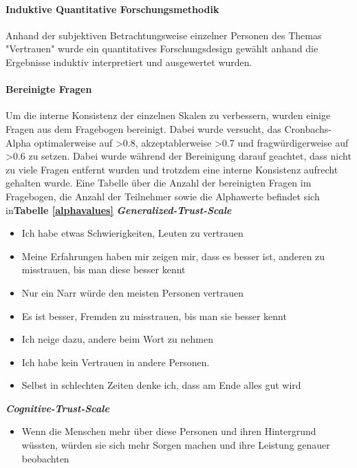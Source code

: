 \documentclass[a4paper,11pt]{article}%
\renewcommand{\\}{\vspace*{0.5\baselineskip} \newline}
\begin{document}
				\paragraph{Induktive Quantitative Forschungsmethodik}
				Anhand der subjektiven Betrachtungsweise einzelner Personen des Themas "Vertrauen" wurde ein quantitatives Forschungsdesign gewählt anhand die Ergebnisse induktiv interpretiert und ausgewertet wurden.


\paragraph{Bereinigte Fragen}
Um die interne Konsistenz der einzelnen Skalen zu verbessern, wurden einige Fragen aus dem Fragebogen bereinigt. Dabei wurde versucht, das Cronbachs-Alpha optimalerweise auf >0.8, akzeptablerweise >0.7 und fragwürdigerweise auf >0.6 zu setzen. Dabei wurde während der Bereinigung darauf geachtet, dass nicht zu viele Fragen entfernt wurden und trotzdem eine interne Konsistenz aufrecht gehalten wurde. Eine Tabelle über die Anzahl der bereinigten Fragen im Fragebogen, die Anzahl der Teilnehmer sowie die Alphawerte befindet sich in\textbf{Tabelle \ref{alphavalues}} \\
\textbf{\textit{Generalized-Trust-Scale}}
\begin{itemize}
	\item Ich habe etwas Schwierigkeiten, Leuten zu vertrauen
	\item Meine Erfahrungen haben mir zeigen mir, dass es besser ist, anderen zu misstrauen, bis man diese besser kennt
	\item Nur ein Narr würde den meisten Personen vertrauen
	\item Es ist besser, Fremden zu misstrauen, bis man sie besser kennt
	\item Ich neige dazu, andere beim Wort zu nehmen
	\item Ich habe kein Vertrauen in andere Personen.
	\item Selbst in schlechten Zeiten denke ich, dass am Ende alles gut wird
\end{itemize}

\textbf{\textit{Cognitive-Trust-Scale}}
\begin{itemize}
	\item Wenn die Menschen mehr über diese Personen und ihren Hintergrund wüssten, würden sie sich mehr Sorgen machen und ihre Leistung genauer beobachten
\end{itemize}
\end{document}
